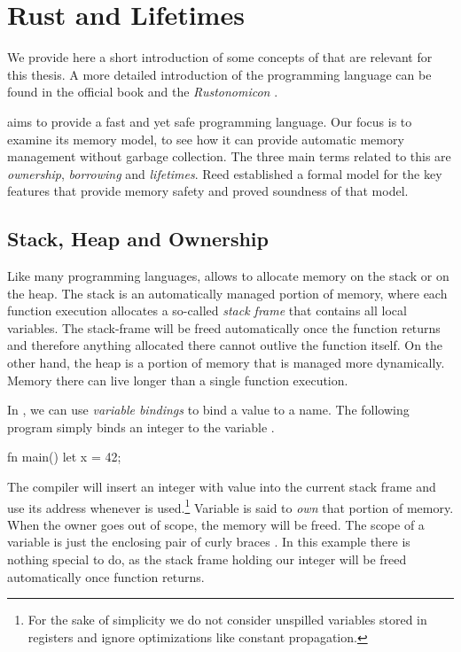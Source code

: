 \section{Rust and Lifetimes}\label{section:background-rust}

We provide here a short introduction of some concepts of \rust that are relevant for this thesis.
A more detailed introduction of the programming language can be found in the official \rust book \cite{RustBook} and the \emph{Rustonomicon} \cite{Rustonomicon}.

\rust aims to provide a fast and yet safe programming language.
Our focus is to examine its memory model, to see how it can provide automatic memory management without garbage collection.
The three main terms related to this are \emph{ownership}, \emph{borrowing} and \emph{lifetimes}.
Reed \cite{Patina} established a formal model for the key features that provide memory safety and proved soundness of that model.

\subsection{Stack, Heap and Ownership}

Like many programming languages, \rust allows to allocate memory on the stack or on the heap.
The stack is an automatically managed portion of memory, where each function execution allocates a so-called \emph{stack frame} that contains all local variables.
The stack-frame will be freed automatically once the function returns and therefore anything allocated there cannot outlive the function itself.
On the other hand, the heap is a portion of memory that is managed more dynamically.
Memory there can live longer than a single function execution.

In \rust, we can use \emph{variable bindings} to bind a value to a name.
The following program simply binds an integer  to the variable .

\begin{rustcode}
fn main() {
	let x = 42;
}
\end{rustcode}

The compiler will insert an integer with value  into the current stack frame and use its address whenever  is used.\footnote{For the sake of simplicity we do not consider unspilled variables stored in registers and ignore optimizations like constant propagation.} Variable  is said to \emph{own} that portion of memory.
When the owner goes out of scope, the memory will be freed.
The scope of a variable is just the enclosing pair of curly braces \rustinline{{ }}.
In this example there is nothing special to do, as the stack frame holding our integer will be freed automatically once function  returns.

